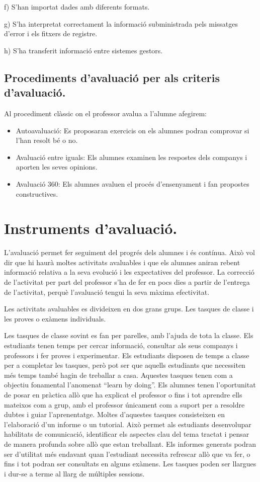 \documentclass[catalan, a4paper, 12pt, titlepage]{article}
\begin{document}
f) S'han importat dades amb diferents formats.

g) S'ha interpretat correctament la informació subministrada pels missatges d'error i els fitxers de registre.

h) S'ha transferit informació entre sistemes gestors.

\subsection{Procediments d'avaluació per als criteris d'avaluació.}
\label{subsec:procediments}

Al procediment clàssic on el professor avalua a l'alumne afegirem:

\begin{itemize}
	\item Autoavaluació: Es proposaran exercicis on els alumnes podran comprovar si l'han resolt bé o no.
	\item Avaluació entre iguals: Els alumnes examinen les respostes dels companys i aporten les seves opinions.
	\item Avaluació 360: Els alumnes avaluen el procés d'ensenyament i fan propostes constructives.
\end{itemize}

\section{Instruments d'avaluació.}
\label{sec:instruments}

L'avaluació permet fer seguiment del progrés dels alumnes i és contínua.
Això vol dir que hi haurà moltes activitats avaluables i que els alumnes aniran rebent informació relativa a la seva evolució i les expectatives del professor.
La correcció de l'activitat per part del professor s'ha de fer en pocs dies a partir de l'entrega de l'activitat, perquè l'avaluació tengui la seva màxima efectivitat.

Les activitats avaluables es divideixen en dos grans grups. 
Les tasques de classe i les proves o exàmens individuals.

Les tasques de classe sovint es fan per parelles, amb l'ajuda de tota la classe.
Els estudiants tenen temps per cercar informació, consultar als seus companys i professors i fer proves i experimentar. 
Els estudiants disposen de temps a classe per a completar les tasques, però pot ser que aquells estudiants que necessiten més temps també hagin de treballar a casa.
Aquestes tasques tenen com a objectiu fonamental l'anomenat ``learn by doing''.
Els alumnes tenen l'oportunitat de posar en pràctica allò que ha explicat el professor o fins i tot aprendre ells mateixos com a grup, amb el professor únicament com a suport per a resoldre dubtes i guiar l'aprenentatge.
Moltes d'aquestes tasques consisteixen en l'elaboració d'un informe o un tutorial.
Això permet als estudiants desenvolupar habilitats de comunicació, identificar els aspectes clau del tema tractat i pensar de manera profunda sobre allò que estan treballant. Els informes generats podran ser d'utilitat més endavant quan l'estudiant necessita refrescar allò que va fer, o fins i tot podran ser consultats en alguns exàmens.
Les tasques poden ser llargues i dur-se a terme al llarg de múltiples sessions.
\end{document}
